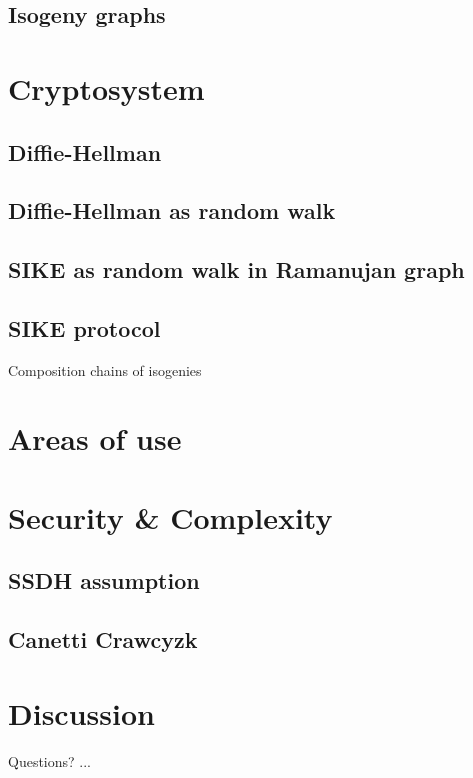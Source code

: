 \documentclass{beamer}
\begin{document}
\subsection{Isogeny graphs}

\section{Cryptosystem}

\subsection{Diffie-Hellman}
\subsection{Diffie-Hellman as random walk}
\subsection{SIKE as random walk in Ramanujan graph}
\subsection{SIKE protocol}

\begin{frame}{Composition chains of isogenies}
\end{frame}

\section{Areas of use}

\section{Security \& Complexity}
\subsection{SSDH assumption}
\subsection{Canetti Crawcyzk}

\section{Discussion}
\begin{frame}{Questions?}
...
\end{frame}
\end{document}
